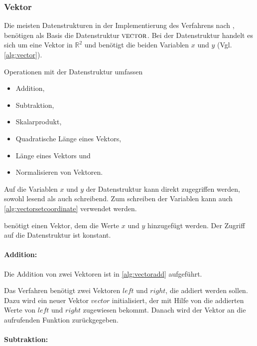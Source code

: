 \subsubsection{Vektor} %
\label{sub:vektor}

Die meisten Datenstrukturen in der Implementierung des Verfahrens nach \citeauthor{hirzer08}, benötigen als Basis die
 Datenstruktur $\textproc{vector}$. Bei der Datenstruktur handelt es sich um eine Vektor in $\mathbb{R}^2$ und benötigt
 die beiden Variablen $x$ und $y$ (Vgl. \autoref{alg:vector}).

Operationen mit der Datenstruktur  umfassen

\begin{itemize}
	\item Addition,
	\item Subtraktion,
	\item Skalarprodukt,
	\item Quadratische Länge eines Vektors,
	\item Länge eines Vektors und
	\item Normalisieren von Vektoren.
\end{itemize}

Auf die Variablen $x$ und $y$ der Datenstruktur kann direkt zugegriffen werden, sowohl lesend als auch schreibend. Zum
 schreiben der Variablen kann auch \autoref{alg:vectorsetcoordinate} verwendet werden.

 benötigt einen Vektor, dem die Werte $x$ und $y$ hinzugefügt werden. Der Zugriff auf die
 Datenstruktur  ist konstant.

\paragraph{Addition:} %
\label{par:addition}

Die Addition von zwei Vektoren ist in \autoref{alg:vectoradd} aufgeführt.

Das Verfahren benötigt zwei Vektoren $\mathit{left}$ und $\mathit{right}$, die addiert werden sollen. Dazu wird ein
 neuer Vektor $\mathit{vector}$ initialisiert, der mit Hilfe von  die addierten Werte von
 $\mathit{left}$ und $\mathit{right}$ zugewiesen bekommt. Danach wird der Vektor an die aufrufenden Funktion
 zurückgegeben.


\paragraph{Subtraktion:} %
\label{par:subtraktion}

